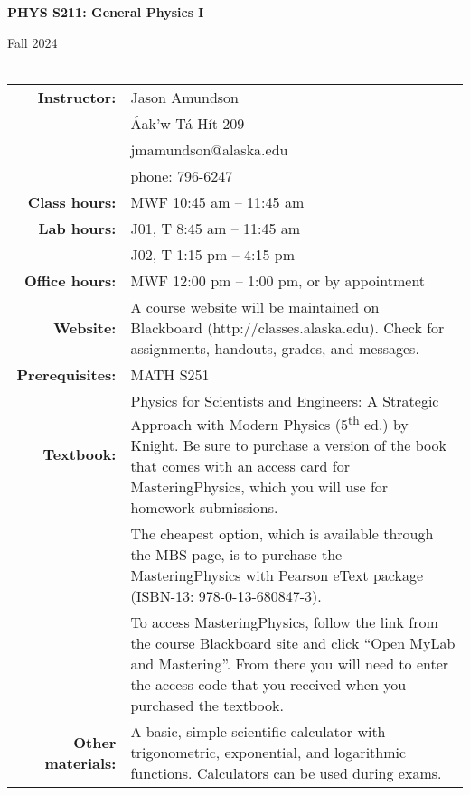 \documentclass[11pt,letterpaper]{article}
\newcommand{\squeezeup}{\vspace{-2.5mm}}
\newcommand{\tablespace}[0]{\vspace{8pt}}
\begin{document}
\begin{centering}
\textbf{PHYS S211: General Physics I}

Fall 2024\\
\hfill{}\\

\bigskip
\begin{table}[h]
\centering
\setlength{\extrarowheight}{2pt}
\squeezeup
\begin{tabular}{@{}r@{\hspace{0.1in}}p{4.25in}} 
{\bf Instructor:} & Jason Amundson\\
& {\'A}ak'w T{\'a} H{\'i}t 209 \\
& jmamundson@alaska.edu\\
& phone: 796-6247 \tablespace\\
{\bf Class hours:} & MWF 10:45 am -- 11:45 am \tablespace\\
{\bf Lab hours:} & J01, T 8:45 am -- 11:45 am\\
& J02, T 1:15 pm -- 4:15 pm \tablespace\\
{\bf Office hours:} & MWF 12:00 pm -- 1:00 pm, or by appointment\tablespace\\
{\bf Website:} & A course website will be maintained on Blackboard (http://classes.alaska.edu). Check for assignments, handouts, grades, and messages.\tablespace\\
{\bf Prerequisites:} & MATH S251\tablespace\\
{\bf Textbook:} & Physics for Scientists and Engineers: A Strategic Approach with Modern Physics (5\textsuperscript{th} ed.) by Knight. Be sure to purchase a version of the book that comes with an access card for MasteringPhysics, which you will use for homework submissions.
\tablespace\\
& The cheapest option, which is available through the MBS page, is to purchase the MasteringPhysics with Pearson eText package (ISBN-13: 978-0-13-680847-3).
\tablespace\\
& To access MasteringPhysics, follow the link from the course Blackboard site and click ``Open MyLab and Mastering''. From there you will need to enter the access code that you received when you purchased the textbook.  \tablespace\\
{\bf Other materials:} & A basic, simple scientific calculator with trigonometric, exponential, and logarithmic functions. Calculators can be used during exams.
\end{tabular}
\end{table}
\end{centering}
\end{document}
